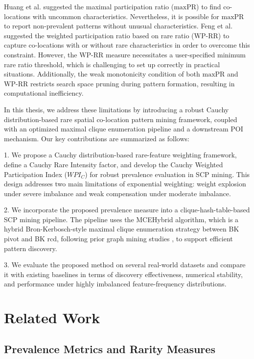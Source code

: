 \documentclass[12pt, letterpaper]{template}
\theoremstyle{definition}
\begin{document}
Huang et al. \cite{huang2006mining} suggested the maximal participation ratio ($\mathrm{maxPR}$) to find co-locations with uncommon characteristics. Nevertheless, it is possible for $\mathrm{maxPR}$ to report non-prevalent patterns without unusual characteristics. Feng et al. \cite{ling2015new} suggested the weighted participation ratio based on rare ratio ($\mathrm{WP\text{-}RR}$) to capture co-locations with or without rare characteristics in order to overcome this constraint. However, the $\mathrm{WP\text{-}RR}$ measure necessitates a user-specified minimum rare ratio threshold, which is challenging to set up correctly in practical situations. Additionally, the weak monotonicity condition of both $\mathrm{maxPR}$ and $\mathrm{WP\text{-}RR}$ restricts search space pruning during pattern formation, resulting in computational inefficiency.

In this thesis, we address these limitations by introducing a robust Cauchy distribution-based rare spatial co-location pattern mining framework, coupled with an optimized maximal clique enumeration pipeline and a downstream POI mechanism. Our key contributions are summarized as follows:

1. We propose a Cauchy distribution-based rare-feature weighting framework, define a Cauchy Rare Intensity factor, and develop the Cauchy Weighted Participation Index (${WPI}_{C}$) for robust prevalence evaluation in SCP mining. This design addresses two main limitations of exponential weighting: weight explosion under severe imbalance and weak compensation under moderate imbalance.

2. We incorporate the proposed prevalence measure into a clique-hash-table-based SCP mining pipeline. The pipeline uses the MCEHybrid algorithm, which is a hybrid Bron-Kerbosch-style maximal clique enumeration strategy between BK pivot and BK rcd, following prior graph mining studies \cite{bron1973algorithm,li2019fast}, to support efficient pattern discovery.

3. We evaluate the proposed method on several real-world datasets and compare it with existing baselines in terms of discovery effectiveness, numerical stability, and performance under highly imbalanced feature-frequency distributions.

\section{Related Work}

\subsection{Prevalence Metrics and Rarity Measures}
\end{document}
